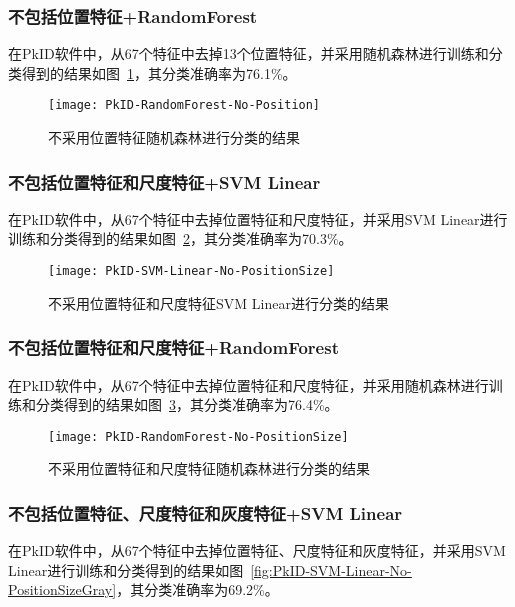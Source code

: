 \subsubsection{不包括位置特征+RandomForest}
在PkID软件中，从67个特征中去掉13个位置特征，并采用随机森林进行训练和分类得到的结果如图~\ref{fig:PkID-RandomForest-No-Position}，其分类准确率为76.1\%。

\begin{figure}[!ht]
\centering
\texttt{[image: PkID-RandomForest-No-Position]}
\caption{不采用位置特征随机森林进行分类的结果}
\label{fig:PkID-RandomForest-No-Position}
\end{figure}

\subsubsection{不包括位置特征和尺度特征+SVM Linear}
在PkID软件中，从67个特征中去掉位置特征和尺度特征，并采用SVM Linear进行训练和分类得到的结果如图~\ref{fig:PkID-SVM-Linear-No-PositionSize}，其分类准确率为70.3\%。

\begin{figure}[!ht]
\centering
\texttt{[image: PkID-SVM-Linear-No-PositionSize]}
\caption{不采用位置特征和尺度特征SVM Linear进行分类的结果}
\label{fig:PkID-SVM-Linear-No-PositionSize}
\end{figure}

\subsubsection{不包括位置特征和尺度特征+RandomForest}
在PkID软件中，从67个特征中去掉位置特征和尺度特征，并采用随机森林进行训练和分类得到的结果如图~\ref{fig:PkID-RandomForest-No-PositionSize}，其分类准确率为76.4\%。

\begin{figure}[!ht]
\centering
\texttt{[image: PkID-RandomForest-No-PositionSize]}
\caption{不采用位置特征和尺度特征随机森林进行分类的结果}
\label{fig:PkID-RandomForest-No-PositionSize}
\end{figure}

\subsubsection{不包括位置特征、尺度特征和灰度特征+SVM Linear}
在PkID软件中，从67个特征中去掉位置特征、尺度特征和灰度特征，并采用SVM Linear进行训练和分类得到的结果如图~\ref{fig:PkID-SVM-Linear-No-PositionSizeGray}，其分类准确率为69.2\%。

